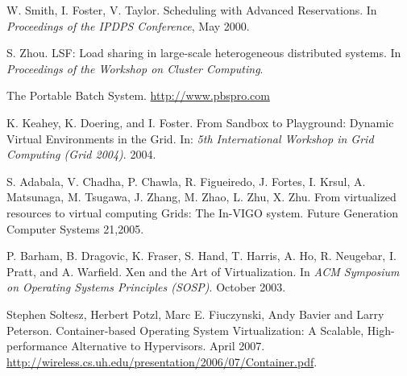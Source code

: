 \documentclass[times,10pt,twocolumn]{article}
\begin{document}
\begin{thebibliography}{99}
W. Smith, I. Foster, V. Taylor.
Scheduling with Advanced Reservations.
In {\em Proceedings of the IPDPS Conference}, May 2000.

S. Zhou.
LSF: Load sharing in large-scale heterogeneous distributed systems.
In {\em Proceedings of the Workshop on Cluster Computing}.

The Portable Batch System. \url{http://www.pbspro.com}

K. Keahey, K. Doering, and I. Foster. From Sandbox to Playground: Dynamic
Virtual
Environments in the Grid. In: {\em 5th International Workshop in Grid Computing
(Grid 2004)}. 2004.

S. Adabala, V. Chadha, P. Chawla, R. Figueiredo, J. Fortes, I. Krsul,
A. Matsunaga, M. Tsugawa, J. Zhang, M. Zhao, L. Zhu, X. Zhu.
From virtualized resources to virtual computing Grids: The In-VIGO system. Future Generation
Computer Systems 21,2005.

P. Barham, B. Dragovic, K. Fraser, S.
Hand, T. Harris, A. Ho, R. Neugebar, I. Pratt, and A.
Warfield. Xen and the Art of Virtualization. In {\em ACM
Symposium on Operating Systems Principles (SOSP)}. October 2003.

Stephen Soltesz, Herbert Potzl, Marc E. Fiuczynski, Andy Bavier and Larry Peterson. Container-based
Operating System Virtualization: A Scalable, High-performance Alternative to Hypervisors. April 2007.
\url{http://wireless.cs.uh.edu/presentation/2006/07/Container.pdf}.

\end{thebibliography}
\end{document}
